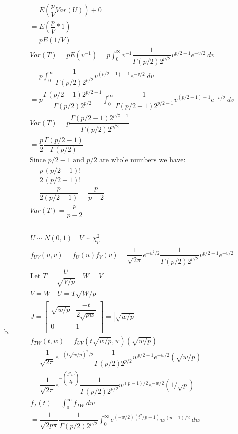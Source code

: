 \documentclass{article}
\begin{document}
\begin{flushleft}
\begin{enumerate}[(a)]
\begin{multline*}
=E\left(\dfrac{p}{V}Var(U)\right)+0\\
=E\left(\dfrac{p}{V}*1\right)\\=pE(1/V)\\
Var(T)=pE(v^{-1})=p\int_{0}^{\infty}v^{-1}\dfrac{1}{\Gamma(p/2)2^{p/2}}v^{p/2-1}e^{-v/2} \ dv\\
=p\int_{0}^{\infty}\dfrac{1}{\Gamma(p/2)2^{p/2}}v^{(p/2-1)-1}e^{-v/2} \ dv\\
=p\dfrac{\Gamma(p/2-1)2^{p/2-1}}{\Gamma(p/2)2^{p/2}}\int_{0}^{\infty}\dfrac{1}{\Gamma(p/2-1)2^{p/2-1}}v^{(p/2-1)-1}e^{-v/2} \ dv\\
Var(T)=p\dfrac{\Gamma(p/2-1)2^{p/2-1}}{\Gamma(p/2)2^{p/2}}\\
=\dfrac{p}{2}\dfrac{\Gamma(p/2-1)}{\Gamma(p/2)}\\
\text{Since } p/2-1 \text{ and } p/2 \text{ are whole numbers we have:}\\
=\dfrac{p}{2}\dfrac{(p/2-1)!}{(p/2-1)!}\\
=\dfrac{p}{2(p/2-1)}=\dfrac{p}{p-2}\\
Var(T)=\dfrac{p}{p-2}\\
\end{multline*}
\item 
\begin{multline*}\\
U\sim N(0,1) \quad V \sim \chi_p^2 \\
f_{UV}(u,v)=f_U(u)f_V(v)=\dfrac{1}{\sqrt{2\pi}}e^{-u^2/2}\dfrac{1}{\Gamma(p/2)2^{p/2}}v^{p/2-1}e^{-v/2}\\
\text{Let } T=\dfrac{U}{\sqrt{V/p}} \quad W=V\\
V=W \quad U=T\sqrt{W/p}\\
J=\begin{bmatrix}
\sqrt{w/p} & \dfrac{-t}{2\sqrt{pw}}\\
0 & 1\\
\end{bmatrix}=|\sqrt{w/p}|\\
f_{TW}(t,w)=f_{UV}(t\sqrt{w/p},w)(\sqrt{w/p})\\
=\dfrac{1}{\sqrt{2\pi}}e^{-(t\sqrt{w/p})^2/2}\dfrac{1}{\Gamma(p/2)2^{p/2}}w^{p/2-1}e^{-w/2}(\sqrt{w/p})\\
=\dfrac{1}{\sqrt{2\pi}}e^{-\left(\dfrac{t^2w}{2p}\right)}\dfrac{1}{\Gamma(p/2)2^{p/2}}w^{(p-1)/2}e^{-w/2}(1/\sqrt{p})\\
f_T(t)=\int_{0}^{\infty}f_{TW} \ dw\\
=\dfrac{1}{\sqrt{2p\pi}}\dfrac{1}{\Gamma(p/2)2^{p/2}}\int_{0}^{\infty}e^{(-w/2)\left(t^2/p+1\right)}w^{(p-1)/2} \ dw\\

\end{multline*}
\end{enumerate}
\end{flushleft}
\end{document}
